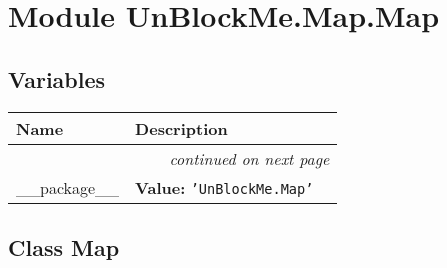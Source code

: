 %
%
%


\section{Module UnBlockMe.Map.Map}

    \label{UnBlockMe:Map:Map}


  \subsection{Variables}

    \vspace{-1cm}
\hspace{\varindent}\begin{longtable}{|p{\varnamewidth}|p{\vardescrwidth}|l}
\cline{1-2}
\cline{1-2} \centering \textbf{Name} & \centering \textbf{Description}& \\
\cline{1-2}
\endhead\cline{1-2}\multicolumn{3}{r}{\small\textit{continued on next page}}\\\endfoot\cline{1-2}
\endlastfoot\raggedright \_\-\_\-p\-a\-c\-k\-a\-g\-e\-\_\-\_\- & \raggedright \textbf{Value:} 
{\tt \texttt{'}\texttt{UnBlockMe.Map}\texttt{'}}&\\
\cline{1-2}
\end{longtable}



\subsection{Class Map}

